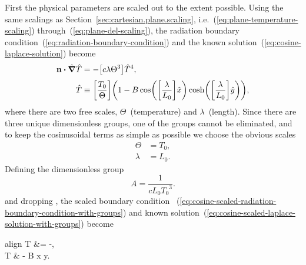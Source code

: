 First the physical parameters are scaled out to the extent possible.
Using the same scalings as Section~\ref{sec:cartesian.plane.scaling},
i.e.~(\ref{eq:plane-temperature-scaling}) through~(\ref{eq:plane-del-scaling}),
the radiation boundary condition~(\ref{eq:radiation-boundary-condition})
and the known solution~(\ref{eq:cosine-laplace-solution})
become
\begin{align}
  \normalvec \dotp \scaleddel \scaled{T}
    &= -\group{c \lambda \Theta^3} \scaled{T}^4,
    \label{eq:cosine-scaled-radiation-boundary-condition-with-groups}
    \\[\tallspace]
  \scaled{T}
    &\ideq
      \group{\frac{T_0}{\Theta}}
      \roundbr*{
        1 -
          B
          \cos \roundbr*{\group{\frac{\lambda}{L_0}} \scaled{x}}
          \cosh \roundbr*{\group{\frac{\lambda}{L_0}} \scaled{y}}
      },
    \label{eq:cosine-scaled-laplace-solution-with-groups}
\end{align}
where there are two free scales, $\Theta$~(temperature) and $\lambda$~(length).
Since there are three unique dimensionless groups,
one of the groups cannot be eliminated,
and to keep the cosinusoidal terms as simple as possible
we choose the obvious scales
\begin{align}
  \Theta &= T_0,
    \label{eq:cosine-temperature-scale} \\
  \lambda &= L_0.
    \label{eq:cosine-length-scale}
\end{align}
Defining the dimensionless group
\begin{equation}
  A = \frac{1}{c L_0 {T_0}^3}.
  \label{eq:cosine-dimensionless-group}
\end{equation}
and dropping \scalingmarks,
the scaled boundary condition~%
  (\ref{eq:cosine-scaled-radiation-boundary-condition-with-groups})
and known solution~(\ref{eq:cosine-scaled-laplace-solution-with-groups})
become
\begin{important}{align}
  \normalvec \dotp \del T &= -,
    \label{eq:cosine-scaled-radiation-boundary-condition} \\[\tallspace]
  T & - B \cos x \cosh y.
    \label{eq:cosine-scaled-laplace-solution}
\end{important}

\begin{figure}
\end{figure}

